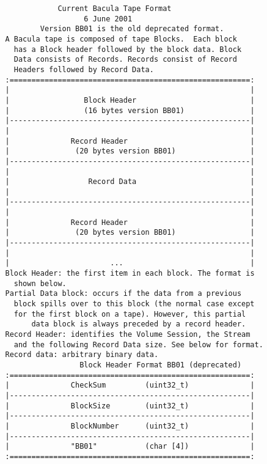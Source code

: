 \footnotesize
\begin{verbatim}
               Current Bacula Tape Format
                     6 June 2001
           Version BB01 is the old deprecated format.
   A Bacula tape is composed of tape Blocks.  Each block
     has a Block header followed by the block data. Block
     Data consists of Records. Records consist of Record
     Headers followed by Record Data.
   :=======================================================:
   |                                                       |
   |                 Block Header                          |
   |                 (16 bytes version BB01)               |
   |-------------------------------------------------------|
   |                                                       |
   |              Record Header                            |
   |               (20 bytes version BB01)                 |
   |-------------------------------------------------------|
   |                                                       |
   |                  Record Data                          |
   |                                                       |
   |-------------------------------------------------------|
   |                                                       |
   |              Record Header                            |
   |               (20 bytes version BB01)                 |
   |-------------------------------------------------------|
   |                                                       |
   |                       ...                             |
   Block Header: the first item in each block. The format is
     shown below.
   Partial Data block: occurs if the data from a previous
     block spills over to this block (the normal case except
     for the first block on a tape). However, this partial
         data block is always preceded by a record header.
   Record Header: identifies the Volume Session, the Stream
     and the following Record Data size. See below for format.
   Record data: arbitrary binary data.
                    Block Header Format BB01 (deprecated)
   :=======================================================:
   |              CheckSum         (uint32_t)              |
   |-------------------------------------------------------|
   |              BlockSize        (uint32_t)              |
   |-------------------------------------------------------|
   |              BlockNumber      (uint32_t)              |
   |-------------------------------------------------------|
   |              "BB01"           (char [4])              |
   :=======================================================:

\end{verbatim}
